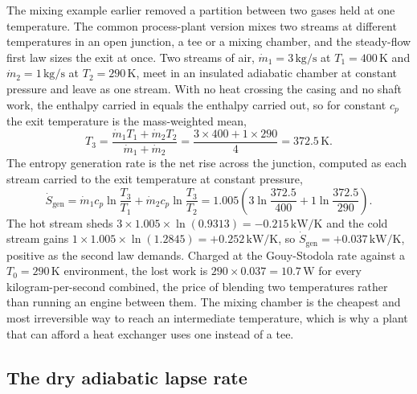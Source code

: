 The mixing example earlier removed a partition between two gases held at one
temperature. The common process-plant version mixes two streams at different
temperatures in an open junction, a tee or a mixing chamber, and the steady-flow
first law sizes the exit at once. Two streams of air, $\dot m_1 = 3\,\text{kg}/
\text{s}$ at $T_1 = 400\,\si{\kelvin}$ and $\dot m_2 = 1\,\text{kg}/\text{s}$ at
$T_2 = 290\,\si{\kelvin}$, meet in an insulated adiabatic chamber at constant
pressure and leave as one stream. With no heat crossing the casing and no shaft
work, the enthalpy carried in equals the enthalpy carried out, so for constant
$c_p$ the exit temperature is the mass-weighted mean,
\[
T_3 = \frac{\dot m_1 T_1 + \dot m_2 T_2}{\dot m_1 + \dot m_2}
    = \frac{3\times 400 + 1\times 290}{4} = 372.5\,\si{\kelvin}.
\]
The entropy generation rate is the net rise across the junction, computed as each
stream carried to the exit temperature at constant pressure,
\[
\dot S_{\text{gen}} = \dot m_1 c_p \ln\frac{T_3}{T_1} + \dot m_2 c_p
\ln\frac{T_3}{T_2}
= 1.005\!\left(3\ln\frac{372.5}{400} + 1\ln\frac{372.5}{290}\right).
\]
The hot stream sheds $3 \times 1.005 \times \ln(0.9313) = -0.215\,\text{kW}/
\si{\kelvin}$ and the cold stream gains $1 \times 1.005 \times \ln(1.2845) =
+0.252\,\text{kW}/\si{\kelvin}$, so $\dot S_{\text{gen}} = +0.037\,\text{kW}/
\si{\kelvin}$, positive as the second law demands. Charged at the Gouy-Stodola
rate against a $T_0 = 290\,\si{\kelvin}$ environment, the lost work is
$290 \times 0.037 = 10.7\,\text{W}$ for every kilogram-per-second combined, the
price of blending two temperatures rather than running an engine between them. The
mixing chamber is the cheapest and most irreversible way to reach an intermediate
temperature, which is why a plant that can afford a heat exchanger uses one
instead of a tee.

\subsection{The dry adiabatic lapse rate}

